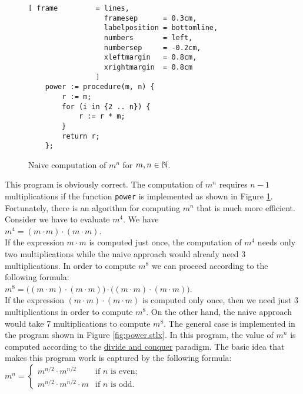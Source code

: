 \begin{figure}[!h]
  \centering
\begin{Verbatim}[ frame         = lines, 
                  framesep      = 0.3cm, 
                  labelposition = bottomline,
                  numbers       = left,
                  numbersep     = -0.2cm,
                  xleftmargin   = 0.8cm,
                  xrightmargin  = 0.8cm
                ]
    power := procedure(m, n) {
        r := m;
        for (i in {2 .. n}) {
            r := r * m;
        }
        return r;
    };
\end{Verbatim}
\vspace*{-0.3cm}
  \caption{Naive computation of $m^n$ for  $m,n \in {\mathbb N}$.}
  \label{fig:power-naive.stlx}
\end{figure} 

This program is obviously correct.  The computation of $m^n$ requires $n-1$ multiplications if the
function \texttt{power}  is implemented as shown in Figure \ref{fig:power-naive.stlx}.
Fortunately, there is an algorithm for computing $m^n$ that is much more efficient.
Consider we have to evaluate $m^4$.  We have
 \\[0.2cm]
\hspace*{1.3cm} 
$m^4 = (m \cdot m) \cdot (m \cdot m)$.
\\[0.2cm]
If the expression $m\cdot m$ is computed just once, the computation of
$m^4$ needs only two multiplications while the naive approach would already need 3 multiplications.
In order to compute $m^8$ we can proceed according to the following formula: \\[0.2cm]
\hspace*{1.3cm} 
$m^8 = \bigl( (m \cdot m) \cdot (m \cdot m) \bigr) \cdot \bigl( (m \cdot m) \cdot (m \cdot m)
\bigr)$. 
\\[0.2cm]
If the expression $(m \cdot m) \cdot (m \cdot m)$ is computed only once, then we need just 3 multiplications
in order to compute $m^8$.   On the other hand, the naive approach would take 7 multiplications to
compute $m^8$.  The general case is implemented in the program shown in Figure \ref{fig:power.stlx}.  
In this program, the value of $m^n$ is computed according to the 
\href{http://en.wikipedia.org/wiki/Divide_and_conquer_algorithm}{divide and conquer} paradigm.
The basic idea that makes this program work is captured by the following formula: 
\\[0.2cm] 
\hspace*{1.3cm} 
$m^n = 
\left\{\begin{array}{ll}
m^{n/2} \cdot m^{n/2}          & \mbox{if $n$ is even};    \\
m^{n/2} \cdot m^{n/2} \cdot m  & \mbox{if $n$ is odd}.
\end{array}
\right.
$
\vspace*{0.3cm}

